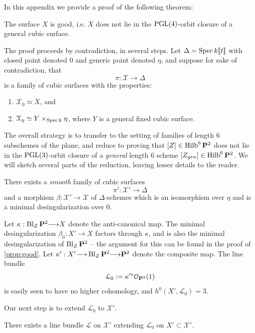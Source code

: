 \documentclass[12pt,reqno]{amsart}
\renewcommand{\k}{k}
\DeclareMathOperator{\Bl}{Bl}
\DeclareMathOperator{\Hilb}{Hilb}
\renewcommand{\to}{{\longrightarrow}}
\numberwithin{equation}{section}
\renewcommand{\O}{\mathcal O}
\begin{document}
In this appendix we provide a proof of the following theorem:

\begin{theorem}
  \label{theorem:A5good} The surface $X$ is good, i.e. $X$ does not
  lie in the $\operatorname{PGL}(4)$-orbit closure of a general cubic surface.
\end{theorem}

The proof proceeds by contradiction, in several steps. Let
$\Delta = \spec \k [\![t]\!]$ with closed point denoted $0$ and generic
point denoted $\eta$, and suppose for sake of contradiction, that
\[\pi: \mathcal{X} \to \Delta\]
is a family of cubic surfaces with the properties:
\begin{enumerate}
\item $\mathcal{X}_{0} \simeq X$, and\\
\item $\mathcal{X}_{\eta} \simeq Y \times_{\spec \k} \eta$, where $Y$ is a
  general fixed cubic surface.
\end{enumerate}

The overall strategy is to transfer to the setting of families of
length $6$ subschemes of the plane, and reduce to proving that
$[Z] \in \Hilb^{6}\P^{2}$ does not lie in the $\operatorname{PGL}(3)$-orbit closure
of a {\sl general} length $6$ scheme $[Z_{gen}] \in \Hilb^{6}\P^{2}$.
We will sketch several parts of the reduction, leaving lesser details
to the reader.

\begin{lemma}[Brieskorn]
  \label{lemma:simult} There exists a {\sl smooth} family of cubic
  surfaces \[\pi': \mathcal{X}' \to \Delta\] and a morphism
  $\beta: \mathcal{X}' \to \mathcal{X}$ of $\Delta$-schemes which is
  an isomorphism over $\eta$ and is a minimal desingularization over
  $0$.
\end{lemma}

Let $\kappa: \Bl_{Z}\P^2 \to X$ denote the anti-canonical map. The
minimal desingularization $\beta_{0}: X' \to X$ factors through
$\kappa$, and is also the minimal desingularization of $\Bl_{Z}\P^{2}$
-- the argument for this can be found in the proof of
\autoref{prop:good}. Let $\kappa':X' \to \Bl_{Z}\P^{2} \to \P^{2}$
denote the composite map.  The line bundle
\[\mathcal{L}_{0} := \kappa'^{*}\O_{\P^{2}}(1)\] is easily seen to have
no higher cohomology, and $h^{0}(X', \mathcal{L}_{0}) = 3$.

Our next step is to extend $\mathcal{L}_{0}$ to $\mathcal{X'}$.

\begin{lemma}
  \label{lemma:extends} There exists a line bundle $\mathcal{L}$ on
  $\mathcal{X}'$ extending $\mathcal{L}_{0}$ on
  $X' \subset \mathcal{X}'$.
\end{lemma}
\end{document}
